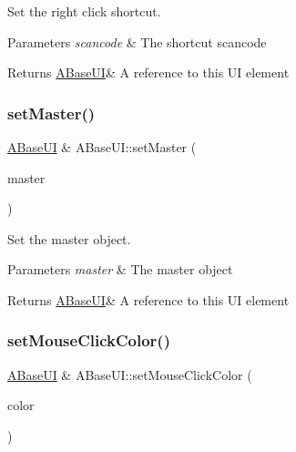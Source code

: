 Set the right click shortcut. 


\begin{DoxyParams}{Parameters}
{\em scancode} & The shortcut scancode \\
\hline
\end{DoxyParams}
\begin{DoxyReturn}{Returns}
\hyperlink{class_a_base_u_i}{A\+Base\+UI}\& A reference to this UI element 
\end{DoxyReturn}
\mbox{\label{class_a_base_u_i_a258f301b41ab8cc9e1b50ca38c27ca78}} 
\subsubsection{\texorpdfstring{set\+Master()}{setMaster()}}
{\footnotesize\ttfamily \hyperlink{class_a_base_u_i}{A\+Base\+UI} \& A\+Base\+U\+I\+::set\+Master (\begin{DoxyParamCaption}\item[{\hyperlink{class_a_base_master_u_i}{A\+Base\+Master\+UI} $\ast$}]{master }\end{DoxyParamCaption})\hspace{0.3cm}{\ttfamily [virtual]}}



Set the master object. 


\begin{DoxyParams}{Parameters}
{\em master} & The master object \\
\hline
\end{DoxyParams}
\begin{DoxyReturn}{Returns}
\hyperlink{class_a_base_u_i}{A\+Base\+UI}\& A reference to this UI element 
\end{DoxyReturn}
\mbox{\label{class_a_base_u_i_ab93705fee3e6dfdc900bea21a42695e0}} 
\subsubsection{\texorpdfstring{set\+Mouse\+Click\+Color()}{setMouseClickColor()}}
{\footnotesize\ttfamily \hyperlink{class_a_base_u_i}{A\+Base\+UI} \& A\+Base\+U\+I\+::set\+Mouse\+Click\+Color (\begin{DoxyParamCaption}\item[{glm\+::vec4}]{color }\end{DoxyParamCaption})\hspace{0.3cm}{\ttfamily [virtual]}}



